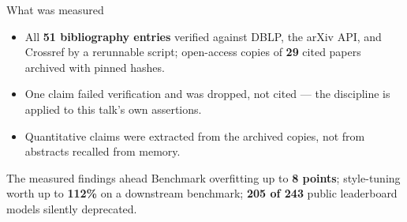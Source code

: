 \documentclass[11pt]{beamer}
\begin{document}
\begin{frame}{What was measured}
  \begin{itemize}
    \item All \textbf{51 bibliography entries} verified against DBLP, the
          arXiv API, and Crossref by a rerunnable script; open-access copies
          of \textbf{29} cited papers archived with pinned hashes.
    \item One claim failed verification and was \alert{dropped, not cited}
          --- the discipline is applied to this talk's own assertions.
    \item Quantitative claims were extracted from the archived copies, not
          from abstracts recalled from memory.
  \end{itemize}
  \begin{block}{The measured findings ahead}
    Benchmark overfitting up to \textbf{8 points}; style-tuning worth up to
    \textbf{112\%} on a downstream benchmark; \textbf{205 of 243} public
    leaderboard models silently deprecated.
  \end{block}
\end{frame}
\end{document}
